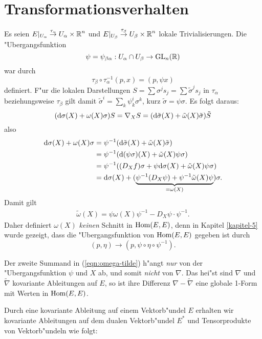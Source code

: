 \section{Transformationsverhalten}

Es seien $E|_{U_\alpha} \overset{\tau_\alpha}{\to} U_\alpha \times \operatorname{\mathbb{R}}^n$ und $E|_{U_\beta} \overset{\tau_\beta}{\to} U_{\beta} \times \operatorname{\mathbb{R}}^n$ lokale Trivialisierungen. Die "Ubergangsfunktion
\[ \psi = \psi_{\beta\alpha}: U_\alpha \cap U_\beta \to \operatorname{GL}_n(\operatorname{\mathbb{R}}) \]
war durch
\[ \tau_\beta \circ \tau_\alpha^{-1} (p,x) = (p, \psi x) \]
definiert.
F"ur die lokalen Darstellungen $S = \sum \sigma^j s_j = \sum \tilde\sigma^j s_j$ in $\tau_\alpha$ beziehungsweise $\tau_\beta$ gilt damit $\tilde\sigma^{i} = \sum_k \psi_k^{i} \sigma^k$, kurz $\tilde\sigma = \psi \sigma$.
Es folgt daraus:
\[ (\mathrm{d} \sigma(X) + \omega(X) \sigma) S = \nabla_X S = (\mathrm{d} \tilde\sigma(X) + \tilde\omega(X)\tilde\sigma) \tilde S \]
also
\begin{align*}
  \mathrm{d} \sigma(X) + \omega(X) \sigma &= \psi^{-1}(\mathrm{d} \tilde\sigma(X) + \tilde\omega(X) \tilde\sigma)\\
  &= \psi^{-1} (\mathrm{d}(\psi\sigma)(X) + \tilde\omega(X) \psi \sigma)\\
  &= \psi^{-1} ((D_X f) \sigma + \psi \mathrm{d} \sigma(X) + \tilde\omega(X) \psi \sigma)\\
  &= \mathrm{d} \sigma(X) + (\underbrace{\psi^{-1}(D_X \psi) + \psi^{-1} \tilde\omega(X) \psi}_{=\omega(X)}) \sigma.
\end{align*}
Damit gilt
\begin{align}
  \tilde\omega(X) = \psi \omega(X) \psi^{-1} - D_X \psi \cdot \psi^{-1}.\label{eqn:omega-tilde}
\end{align}
Daher definiert $\omega(X)$ \emph{keinen} Schnitt in $\operatorname{Hom}(E, E)$, denn in Kapitel \ref{kapitel-5} wurde gezeigt, dass die "Ubergangsfunktion von $\operatorname{Hom}(E, E)$ gegeben ist durch
\[ (p, \eta) \to (p, \psi \circ \eta \circ \psi^{-1}). \]

\begin{bem}
  Der zweite Summand in (\ref{eqn:omega-tilde}) h"angt \emph{nur} von der "Ubergangsfunktion $\psi$ und $X$ ab, und somit \emph{nicht} von $\nabla$.
  Das hei"st sind $\nabla$ und $\tilde\nabla$ kovariante Ableitungen auf $E$, so ist ihre Differenz $\nabla - \tilde\nabla$ eine globale 1-Form mit Werten in $\operatorname{Hom}(E,E)$.
\end{bem}

Durch eine kovariante Ableitung auf einem Vektorb"undel $E$ erhalten wir kovariante Ableitungen auf dem dualen Vektorb"undel $E^*$ und Tensorprodukte von Vektorb"undeln wie folgt:

